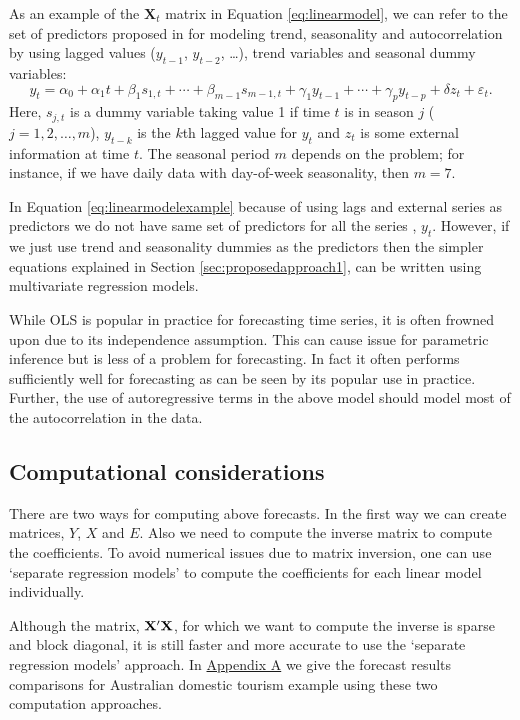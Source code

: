 \documentclass[11pt,a4paper,]{article}
\begin{document}
As an example of the \(\bm{X}_t\) matrix in Equation
\eqref{eq:linearmodel}, we can refer to the set of predictors proposed in
\textcite{ashouri2018} for modeling trend, seasonality and
autocorrelation by using lagged values (\(y_{t-1}\), \(y_{t-2}\),
\dots), trend variables and seasonal dummy variables:
\begin{equation}\label{eq:linearmodelexample}
    y_t = \alpha_0 + \alpha_1 t + \beta_1 s_{1,t} + \cdots + \beta_{m-1} s_{m-1,t} + \gamma_1 y_{t-1} + \cdots + \gamma_p y_{t-p} + \delta z_t + \varepsilon_t.
\end{equation} Here, \(s_{j,t}\) is a dummy variable taking value 1 if
time \(t\) is in season \(j\) (\(j=1, 2, \dots, m\)), \(y_{t-k}\) is the
\(k\)th lagged value for \(y_t\) and \(z_t\) is some external
information at time \(t\). The seasonal period \(m\) depends on the
problem; for instance, if we have daily data with day-of-week
seasonality, then \(m=7\).

In Equation \eqref{eq:linearmodelexample} because of using lags and
external series as predictors we do not have same set of predictors for
all the series , \(y_t\). However, if we just use trend and seasonality
dummies as the predictors then the simpler equations explained in
Section \ref{sec:proposedapproach1}, can be written using multivariate
regression models.

While OLS is popular in practice for forecasting time series, it is
often frowned upon due to its independence assumption. This can cause
issue for parametric inference but is less of a problem for forecasting.
In fact it often performs sufficiently well for forecasting as can be
seen by its popular use in practice. Further, the use of autoregressive
terms in the above model should model most of the autocorrelation in the
data.

\hypertarget{computational-considerations}{%
\subsection{Computational
considerations}\label{computational-considerations}}

There are two ways for computing above forecasts. In the first way we
can create matrices, \(Y\), \(X\) and \(E\). Also we need to compute the
inverse matrix to compute the coefficients. To avoid numerical issues
due to matrix inversion, one can use `separate regression models' to
compute the coefficients for each linear model individually.

Although the matrix, \(\bf X'X\), for which we want to compute the
inverse is sparse and block diagonal, it is still faster and more
accurate to use the `separate regression models' approach. In
\protect\hyperlink{appendixA}{Appendix A} we give the forecast results
comparisons for Australian domestic tourism example using these two
computation approaches.
\end{document}
